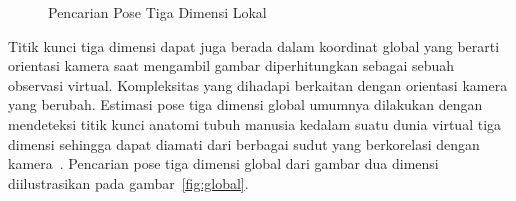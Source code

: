 \begin{figure}[htbp]
    \begin{center}
    \end{center}
    \vspace{-20pt}
    \captionsetup{labelfont=bf, textfont=bf}
    \caption{Pencarian Pose Tiga Dimensi Lokal}
    \vspace{-10pt}
    \captionsetup{labelfont=md, textfont=md}
    \label{fig:lokal}
\end{figure}

Titik kunci tiga dimensi dapat juga berada dalam koordinat global yang berarti orientasi kamera
saat mengambil gambar diperhitungkan sebagai sebuah observasi virtual. Kompleksitas yang dihadapi
berkaitan dengan orientasi kamera yang berubah. Estimasi pose tiga dimensi global umumnya dilakukan
dengan mendeteksi titik kunci anatomi tubuh manusia kedalam suatu dunia virtual tiga dimensi sehingga
dapat diamati dari berbagai sudut yang berkorelasi dengan kamera~\cite{2017arXiv170402447Z, 2019arXiv190700837M}.
Pencarian pose tiga dimensi global dari gambar dua dimensi diilustrasikan pada gambar~\ref{fig:global}.

